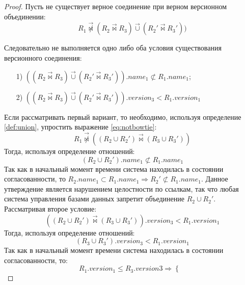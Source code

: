 \begin{proof}
	\indent Пусть не существует верное соединение при верном версионном объединении:
	\begin{equation}
		\label{eq:notbowtie}
		R_1 \overrightarrow{\not\bowtie} (R_2 \overrightarrow{\bowtie} R_3 ) \overrightarrow{\cup} (R_2' \overrightarrow{\bowtie} R_3'))
	\end{equation}
	
	\indent Следовательно не выполняется одно либо оба условия существования версионного соединения:
	\begin{enumerate}
		\item[1)] $((R_2 \overrightarrow{\bowtie} R_3 ) \overrightarrow{\cup} (R_2' \overrightarrow{\bowtie} R_3')).name_1 \not\subset R_1.name_1$;
		\item[2)] $((R_2 \overrightarrow{\bowtie} R_3 ) \overrightarrow{\cup} (R_2' \overrightarrow{\bowtie} R_3')).version_3 < R_1.version_1$
	\end{enumerate}
	\indent Если рассматривать первый вариант, то необходимо, используя определение \ref{def:union}, упростить выражение \ref{eq:notbowtie}:
	\begin{equation}
		R_1 \overrightarrow{\not\bowtie} ((R_2 \cup R_2') \overrightarrow{\bowtie} (R_3 \cup R_3'))
	\end{equation}
	\indent Тогда, используя определение отношений:
	\begin{equation}
		(R_2 \cup R_2').name_1 \not\subset R_1.name_1
	\end{equation}
	\indent Так как в начальный момент времени система находилась в состоянии согласованности, то $R_2.name_1 \subset R_1.name_1 \Rightarrow R_2' \not\subset R_1.name_1$.
	Данное утверждение является нарушением целостности по ссылкам, так что любая система управления базами данных запретит объединение $R_2 \cup R_2'$.\\
	\indent Рассматривая второе условие:
	\begin{equation}
		((R_2 \cup R_2') \overrightarrow{\bowtie} (R_3 \cup R_3')).version_3 < R_1.version_1
	\end{equation}
	\indent Тогда, используя определение отношений:
	\begin{equation}
		(R_3 \cup R_3').version_3 < R_1.version_1
	\end{equation}
	\indent Так как в начальный момент времени система находилась в состоянии согласованности, то:
	\begin{equation}
		R_1.version_1 \leq R_3.version3 \Rightarrow
		\begin{cases}

\end{cases}
\end{equation}
\end{proof}
